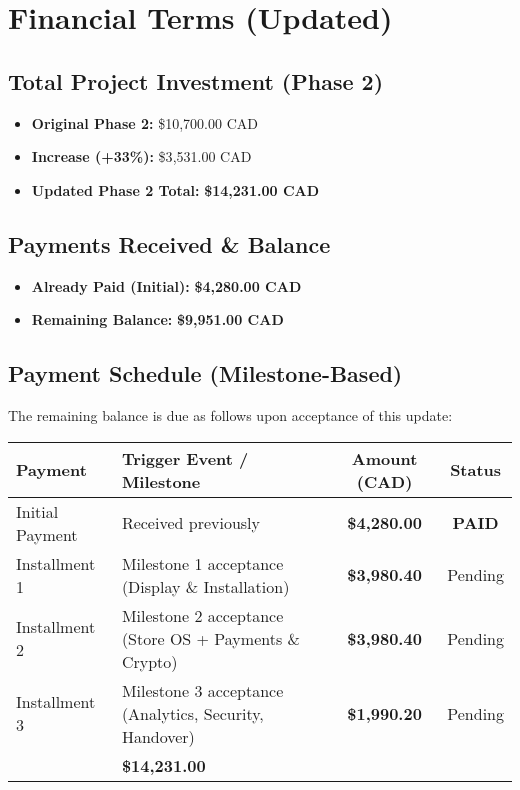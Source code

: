 \documentclass[11pt, a4paper]{article}
\begin{document}
\section{Financial Terms (Updated)}
\subsection{Total Project Investment (Phase 2)}
\begin{itemize}
  \item \textbf{Original Phase 2:} \$10{,}700.00 CAD
  \item \textbf{Increase (+33\%):} \$3{,}531.00 CAD
  \item \textbf{Updated Phase 2 Total:} \textbf{\$14{,}231.00 CAD}
\end{itemize}

\subsection{Payments Received \& Balance}
\begin{itemize}
  \item \textbf{Already Paid (Initial):} \textbf{\$4{,}280.00 CAD}
  \item \textbf{Remaining Balance:} \textbf{\$9{,}951.00 CAD}
\end{itemize}

\subsection{Payment Schedule (Milestone-Based)}
The remaining balance is due as follows upon acceptance of this update:
\begin{center}
\begin{tabular}{|l >{\raggedright\arraybackslash}p{7.2cm} c c|}
\hline
\rowcolor{lightgray}\textbf{Payment} & \textbf{Trigger Event / Milestone} & \textbf{Amount (CAD)} & \textbf{Status}\\
\hline
Initial Payment & Received previously & \textbf{\$4{,}280.00} & \textbf{PAID}\\
\hline
Installment 1 & Milestone 1 acceptance (Display \& Installation) & \textbf{\$3{,}980.40} & Pending\\
\hline
Installment 2 & Milestone 2 acceptance (Store OS + Payments \& Crypto) & \textbf{\$3{,}980.40} & Pending\\
\hline
Installment 3 & Milestone 3 acceptance (Analytics, Security, Handover) & \textbf{\$1{,}990.20} & Pending\\
\hline
\rowcolor{lightgray}\multicolumn{2}{|r|}{\textbf{TOTAL PHASE 2 (Updated)}} & \textbf{\$14{,}231.00} & \\
\hline
\end{tabular}
\end{center}
\end{document}
